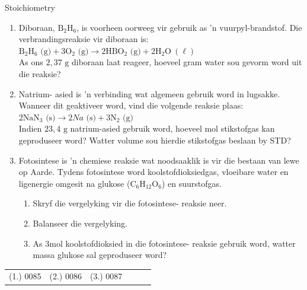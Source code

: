     \noindent
            \begin{exercises}{  Stoichiometry
      }
            \nopagebreak \noindent
      \label{m38712*id285393}\begin{enumerate}[noitemsep, label=\textbf{\arabic*}. ] 
            \label{m38712*uid101}\item Diboraan, $\text{B}{}_{2}\text{H}{}_{6}$, is voorheen oorweeg vir gebruik as  'n vuurpyl-brandstof. Die verbrandingsreaksie vir diboraan is:\\
${\text{B}}_{2}{\text{H}}_{6} \text{ (g)} + 3{\text{O}}_{2} \text{ (g)} \to 2\text{H}\text{B}{\text{O}}_{2} \text{ (g)} + 2{\text{H}}_{2}\text{O} ~\left( \ell \right)$\\
As ons $2,37 \text{ g}$ diboraan laat reageer, hoeveel gram water sou gevorm word uit die reaksie?
\item Natrium- asied is  'n verbinding wat algemeen gebruik word in lugsakke. Wanneer dit geaktiveer word, vind die volgende reaksie plaas: \\
$2{\text{NaN}}_{3} \text{ (s)} \to 2Na \text{ (s)} + 3{\text{N}}_{2} \text{ (g)}$\\
Indien $23,4 \text{ g}$ natrium-asied gebruik word, hoeveel mol stikstofgas kan geproduseer word? Watter volume sou hierdie stikstofgas beslaan by STD?
\label{m38712*uid103}\item Fotosintese is  'n chemiese reaksie wat noodsaaklik is vir die bestaan ​​van lewe op
         Aarde. Tydens fotosintese word koolstofdioksiedgas, vloeibare water en ligenergie omgesit na glukose ($\text{C}{}_{6}\text{H}{}_{12}\text{O}{}_{6}$) en suurstofgas.
\label{m38712*id285674}\begin{enumerate}[noitemsep, label=\textbf{\alph*}. ] 
            \label{m38712*uid104}\item Skryf die vergelyking vir die fotosintese- reaksie neer.
\label{m38712*uid105}\item Balanseer die vergelyking.
\label{m38712*uid106}\item As $3 \text{mol}$ koolstofdioksied in die fotosintese- reaksie gebruik word, watter massa glukose sal geproduseer word?
\end{enumerate}
                \end{enumerate}
\practiceinfo
\par 
 \par \begin{tabular}[h]{cccccc}
 (1.) 0085  &  (2.) 0086  &  (3.) 0087  & \end{tabular}
\end{exercises}

